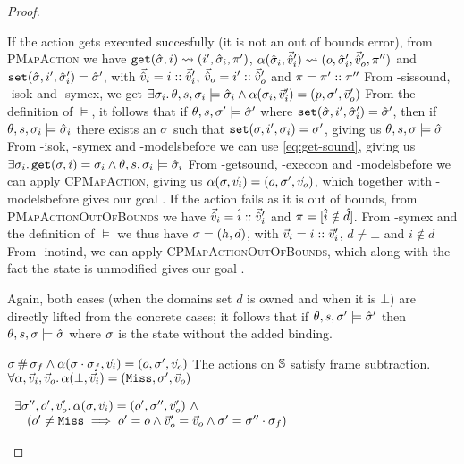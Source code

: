 \begin{proof}
\begin{hypvlist}
 If the action gets executed succesfully (it is not an out of bounds error), from \textsc{PMapAction} we have $\texttt{get}(\hat{\sigma},i)\rightsquigarrow(i',\hat{\sigma}_i,\pi')$, $\alpha(\hat{\sigma}_i,\vec{\hat{v}}_i')\rightsquigarrow(o,\hat{\sigma}'_i,\vec{\hat{v}}_o',\pi'')$ and ${\texttt{set}(\hat{\sigma},i',\hat{\sigma}'_i)=\hat{\sigma}'}$, with $\vec{\hat{v}}_i=i::\vec{\hat{v}}_i'$, $\vec{\hat{v}}_o=i'::\vec{\hat{v}}_o'$ and $\pi=\pi'::\pi''$
 From \hyp{sissound}, \hyp{isok} and \hyp{symex}, we get $\exists \sigma_i\ldotp \theta,s,\sigma_i\models\hat{\sigma}_i \land \alpha(\sigma_i,\vec{v}_i')=(p,\sigma',\vec{v}_o')$
 From the definition of $\models$, it follows that if $\theta,s,\sigma'\models\hat{\sigma}'$ where $\texttt{set}(\hat{\sigma},i',\hat{\sigma}'_i)=\hat{\sigma}'$, then if $\theta,s,\sigma_i\models\hat{\sigma}_i$ there exists an $\sigma$ such that $\texttt{set}(\sigma,i',\sigma_i)=\sigma'$, giving us $\theta,s,\sigma\models\hat{\sigma}$
 From \hyp{isok}, \hyp{symex} and \hyp{modelsbefore} we can use \ref{eq:get-sound}, giving us ${\exists \sigma_i \ldotp \texttt{get}(\sigma, i)=\sigma_i} \land \theta,s,\sigma_i \models \hat{\sigma}_i$
 From \hyp{getsound}, \hyp{execcon} and \hyp{modelsbefore} we can apply \textsc{CPMapAction}, giving us ${\alpha(\sigma,\vec{v}_i)=(o,\sigma',\vec{v}_o)}$, which together with \hyp{modelsbefore} gives our goal .
 If the action fails as it is out of bounds, from \textsc{PMapActionOutOfBounds} we have $\vec{\hat{v}}_i=\hat{i}::\vec{\hat{v}}_i'$ and $\pi=[\hat{i}\notin \hat{d}]$.
 From \hyp{symex} and the definition of $\models$ we thus have $\sigma=(h,d)$, with $\vec{v}_i=i::\vec{v}_i'$, $d\neq\bot$ and $i\notin d$
 From \hyp{inotind}, we can apply \textsc{CPMapActionOutOfBounds}, which along with the fact the state is unmodified gives our goal .
\end{hypvlist}

\pfcase{$\alpha=\alloc$}

Again, both cases (when the domains set $d$ is owned and when it is $\bot$) are directly lifted from the concrete cases; it follows that if $\theta,s,\sigma'\models\hat{\sigma}'$ then $\theta,s,\sigma\models\hat{\sigma}$ where $\sigma$ is the state without the added binding.


\pfassume \begin{hypvlist}
 $\sigma\operatorname{\#}\sigma_f \land \alpha(\sigma\cdot\sigma_f,\vec{v}_i)=(o,\sigma',\vec{v}_o)$
 The actions on $\mathbb S$ satisfy frame subtraction.
{\color{red} $\forall \alpha, \vec{v}_i, \vec{v}_o\ldotp \alpha(\bot,\vec{v}_i)=(\texttt{Miss},\sigma',\vec{v}_o)$}
\end{hypvlist}
\pfprove \begin{goalvlist}
 $\begin{array}{l}
\exists \sigma'', o', \vec{v}_o'\ldotp \alpha(\sigma,\vec{v}_i)=(o', \sigma'', \vec{v}_o') ~\land \\
\quad(o' \neq \texttt{Miss} \implies o' = o \land  \vec{v}_o' = \vec{v}_o \land \sigma' = \sigma'' \cdot \sigma_f)
\end{array}$
\end{goalvlist}


\end{proof}
